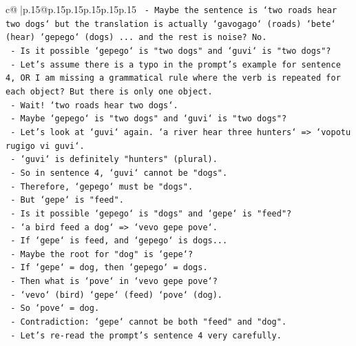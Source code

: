 \documentclass{article}
\begin{document}
{\begin{supertabular}{c@{$\;$}|p{.15\linewidth}@{}p{.15\linewidth}p{.15\linewidth}p{.15\linewidth}p{.15\linewidth}p{.15\linewidth}}
{{{\texttt{                   {-} Maybe the sentence is `two roads hear two dogs` but the translation is actually `gavogago` (roads) `bete` (hear) `gepego` (dogs) ... and the rest is noise? No.} \\
\texttt{                   {-} Is it possible `gepego` is "two dogs" and `guvi` is "two dogs"?} \\
\texttt{                   {-} Let's assume there is a typo in the prompt's example for sentence 4, OR I am missing a grammatical rule where the verb is repeated for each object? But there is only one object.} \\
\texttt{                   {-} Wait! `two roads hear two dogs`.} \\
\texttt{                   {-} Maybe `gepego` is "two dogs" and `guvi` is "two dogs"?} \\
\texttt{                   {-} Let's look at `guvi` again. `a river hear three hunters` => `vopotu rugigo vi guvi`.} \\
\texttt{                   {-} `guvi` is definitely "hunters" (plural).} \\
\texttt{                   {-} So in sentence 4, `guvi` cannot be "dogs".} \\
\texttt{                   {-} Therefore, `gepego` must be "dogs".} \\
\texttt{                   {-} But `gepe` is "feed".} \\
\texttt{                   {-} Is it possible `gepego` is "dogs" and `gepe` is "feed"?} \\
\texttt{                     {-} `a bird feed a dog` => `vevo gepe pove`.} \\
\texttt{                     {-} If `gepe` is feed, and `gepego` is dogs...} \\
\texttt{                     {-} Maybe the root for "dog" is `gepe`?} \\
\texttt{                     {-} If `gepe` = dog, then `gepego` = dogs.} \\
\texttt{                     {-} Then what is `pove` in `vevo gepe pove`?} \\
\texttt{                     {-} `vevo` (bird) `gepe` (feed) `pove` (dog).} \\
\texttt{                     {-} So `pove` = dog.} \\
\texttt{                     {-} Contradiction: `gepe` cannot be both "feed" and "dog".} \\
\texttt{                   {-} Let's re{-}read the prompt's sentence 4 very carefully.} \\
}}}
\end{supertabular}}
\end{document}
